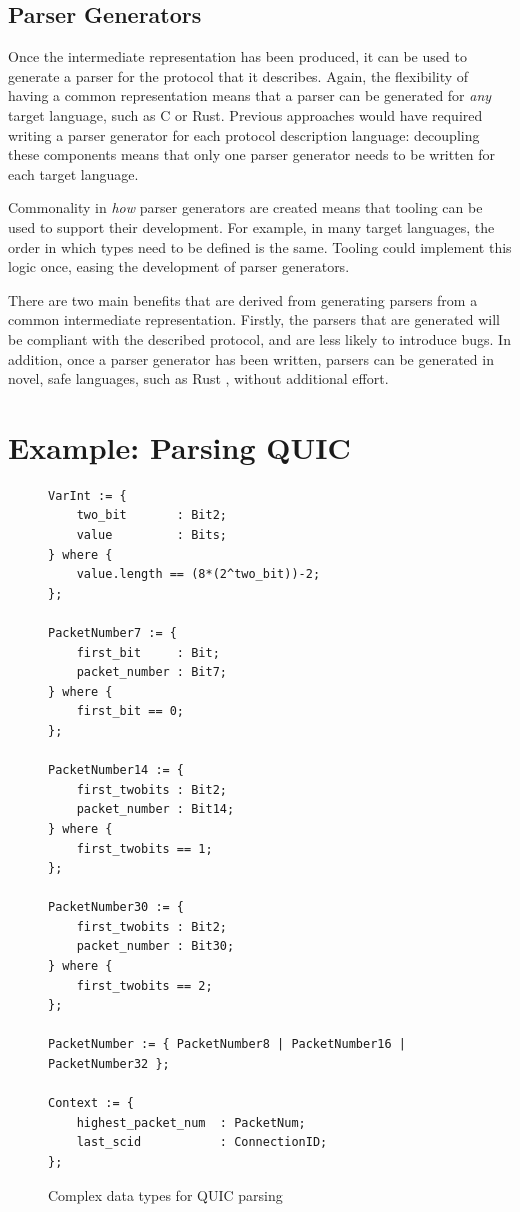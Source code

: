 \documentclass[10pt,sigconf]{acmart}
\begin{document}
\subsection{Parser Generators}
\label{sec:npr-output}

Once the intermediate representation has been produced, it can be used to generate a
parser for the protocol that it describes. Again, the flexibility of having a common
representation means that a parser can be generated for \emph{any} target language, such
as C or Rust. Previous approaches would have required writing a parser generator for each
protocol description language: decoupling these components means that only one parser
generator needs to be written for each target language.

Commonality in \emph{how} parser generators are created means that tooling can be used to
support their development. For example, in many target languages, the order in which types
need to be defined is the same. Tooling could implement this logic once, easing the
development of parser generators.

There are two main benefits that are derived from generating parsers from a common
intermediate representation. Firstly, the parsers that are generated will be compliant
with the described protocol, and are less likely to introduce bugs. In addition, once a
parser generator has been written, parsers can be generated in novel, safe languages, such
as Rust \cite{chifflier2017writing}, without additional effort.

\section{Example: Parsing QUIC}
\label{sec:casestudy}

\begin{figure}
	\vspace{3mm}
    \begin{BVerbatim}[fontsize=\scriptsize]
VarInt := {
	two_bit       : Bit2;
	value         : Bits;
} where {
	value.length == (8*(2^two_bit))-2;
};

PacketNumber7 := {
	first_bit     : Bit;
	packet_number : Bit7;
} where {
	first_bit == 0;
};

PacketNumber14 := {
	first_twobits : Bit2;
	packet_number : Bit14;
} where {
	first_twobits == 1;
};

PacketNumber30 := {
	first_twobits : Bit2;
	packet_number : Bit30;
} where {
	first_twobits == 2;
};

PacketNumber := { PacketNumber8 | PacketNumber16 | PacketNumber32 };
                     
Context := {
	highest_packet_num  : PacketNum;
	last_scid           : ConnectionID;
};
    \end{BVerbatim}
    \caption{Complex data types for QUIC parsing}
    \label{fig:quic-base}
\end{figure}
\end{document}
